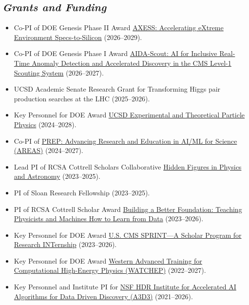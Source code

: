 \documentclass[11pt]{res}
\newcommand{\MarginText}[1]{\section{\textit{#1}}}
\begin{document}
\begin{resume}
  \MarginText{Grants and Funding}
  \begin{itemize}
    \itemsep-0.3em
    \item Co-PI of DOE Genesis Phase II Award \href{https://science.osti.gov/-/media/funding/pdf/Awards-Lists/2026/GM-RFA-Awards-List_09-30-26.pdf}{AXESS: Accelerating eXtreme Environment Specs-to-Silicon} (2026--2029).
    \item Co-PI of DOE Genesis Phase I Award \href{https://pamspublic.science.energy.gov/webPAMSExternal/Interface/Common/ViewPublicAbstract.aspx?rv=13e3fcd3-f9ea-441e-ac06-32397ff74d5b&rtc=24}{AIDA-Scout: AI for Inclusive Real-Time Anomaly Detection and Accelerated Discovery in the CMS Level-1 Scouting System} (2026--2027).
    \item UCSD Academic Senate Research Grant for Transforming Higgs pair production searches at the LHC (2025--2026).
    \item Key Personnel for DOE Award \href{https://pamspublic.science.energy.gov/WebPAMSExternal/Interface/Common/ViewPublicAbstract.aspx?rv=2af52921-6271-4d62-bec1-3e7b28c4fcbe&rtc=24&PRoleId=10}{UCSD Experimental and Theoretical Particle Physics} (2024--2028).
    \item Co-PI of \href{https://www.nsf.gov/awardsearch/showAward?AWD_ID=2425206&HistoricalAwards=false}{PREP: Advancing Research and Education in AI/ML for Science (AREAS)} (2024--2027).
    \item Lead PI of RCSA Cottrell Scholars Collaborative \href{https://hiddenfigs.github.io}{Hidden Figures in Physics and Astronomy} ({2023--2025}).
    \item PI of Sloan Research Fellowship (2023--2025).
    \item PI of RCSA Cottrell Scholar Award \href{https://rescorp.org/cottrell-scholars/2023-cottrell-scholars}{Building a Better Foundation: Teaching Physicists and Machines How to Learn from Data} ({2023--2026}).
    \item Key Personnel for DOE Award \href{https://www.energy.gov/articles/doe-announces-32-million-research-opportunities-underrepresented-groups}{U.S. CMS SPRINT---A Scholar Program for Research INTernship} (2023--2026).
    \item Key Personnel for DOE Award \href{https://www.energy.gov/science/articles/department-energy-announces-10-million-traineeships-computational-high-energy}{Western Advanced Training for Computational High-Energy Physics (WATCHEP)} (2022--2027).
    \item Key Personnel and Institute PI for \href{https://www.nsf.gov/awardsearch/showAward?AWD_ID=2117997&HistoricalAwards=false}{NSF HDR Institute for Accelerated AI Algorithms for Data Driven Discovery (A3D3)} ({2021--2026}).

\end{itemize}
\end{resume}
\end{document}
